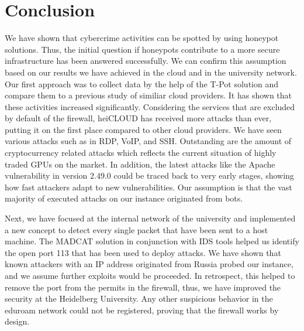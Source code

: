 \chapter{Conclusion}

We have shown that cybercrime activities can be spotted by using honeypot solutions.
Thus, the initial question if honeypots contribute to a more secure infrastructure has been answered successfully.
We can confirm this assumption based on our results we have achieved in the cloud and in the university network.
Our first approach was to collect data by the help of the T-Pot solution and compare them to a previous study of similiar cloud providers.
It has shown that these activities increased significantly.
Considering the services that are excluded by default of the firewall, heiCLOUD has received more attacks than ever, putting it on the first place compared to other cloud providers.
We have seen various attacks such as in RDP, VoIP, and SSH.
Outstanding are the amount of cryptocurrency related attacks which reflects the current situation of highly traded GPUs on the market.
In addition, the latest attacks like the Apache vulnerability in version $2.49.0$ could be traced back to very early stages, showing how fast attackers adapt to new vulnerabilities.
Our assumption is that the vast majority of executed attacks on our instance originated from bots.

Next, we have focused at the internal network of the university and implemented a new concept to detect every single packet that have been sent to a host machine.
The MADCAT solution in conjunction with IDS tools helped us identify the open port 113 that has been used to deploy attacks.
We have shown that known attackers with an IP address originated from Russia probed our instance, and we assume further exploits would be proceeded.
In retrospect, this helped to remove the port from the permits in the firewall, thus, we have improved the security at the Heidelberg University.
Any other suspicious behavior in the eduroam network could not be registered, proving that the firewall works by design.

